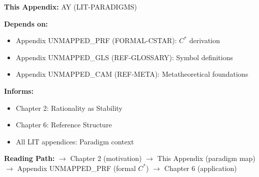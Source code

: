 \begin{tcolorbox}[colback=gray!10!white, colframe=gray!75!black,
    title=\textbf{Cross-Reference Footer}]

\textbf{This Appendix:} AY (LIT-PARADIGMS)

\textbf{Depends on:}
\begin{itemize}[nosep]
    \item Appendix UNMAPPED_PRF (FORMAL-CSTAR): $C^*$ derivation
    \item Appendix UNMAPPED_GLS (REF-GLOSSARY): Symbol definitions
    \item Appendix UNMAPPED_CAM (REF-META): Metatheoretical foundations
\end{itemize}

\textbf{Informs:}
\begin{itemize}[nosep]
    \item Chapter 2: Rationality as Stability
    \item Chapter 6: Reference Structure
    \item All LIT appendices: Paradigm context
\end{itemize}

\textbf{Reading Path:}
$\rightarrow$ Chapter 2 (motivation) $\rightarrow$ This Appendix (paradigm map)
$\rightarrow$ Appendix UNMAPPED_PRF (formal $C^*$) $\rightarrow$ Chapter 6 (application)

\end{tcolorbox}

